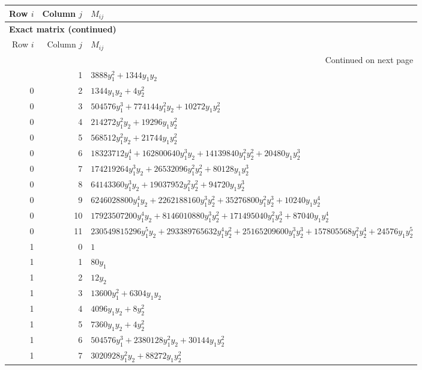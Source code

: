 \documentclass[10pt,a4paper]{article}
\begin{document}
{\small\setlength{\tabcolsep}{7pt}\begin{longtable}{rrp{125mm}}
\toprule Row $i$ & Column $j$ & $M_{ij}$\\\midrule\endfirsthead
\multicolumn{3}{l}{\textbf{Exact matrix (continued)}}\\
\toprule Row $i$ & Column $j$ & $M_{ij}$\\\midrule\endhead
\midrule\multicolumn{3}{r}{Continued on next page}\\\endfoot\bottomrule\endlastfoot
0 & 1 & $3888 y_{1}^{2} + 1344 y_{1} y_{2}$\\
0 & 2 & $1344 y_{1} y_{2} + 4 y_{2}^{2}$\\
0 & 3 & $504576 y_{1}^{3} + 774144 y_{1}^{2} y_{2} + 10272 y_{1} y_{2}^{2}$\\
0 & 4 & $214272 y_{1}^{2} y_{2} + 19296 y_{1} y_{2}^{2}$\\
0 & 5 & $568512 y_{1}^{2} y_{2} + 21744 y_{1} y_{2}^{2}$\\
0 & 6 & $18323712 y_{1}^{4} + 162800640 y_{1}^{3} y_{2} + 14139840 y_{1}^{2} y_{2}^{2} + 20480 y_{1} y_{2}^{3}$\\
0 & 7 & $174219264 y_{1}^{3} y_{2} + 26532096 y_{1}^{2} y_{2}^{2} + 80128 y_{1} y_{2}^{3}$\\
0 & 8 & $64143360 y_{1}^{3} y_{2} + 19037952 y_{1}^{2} y_{2}^{2} + 94720 y_{1} y_{2}^{3}$\\
0 & 9 & $6246028800 y_{1}^{4} y_{2} + 2262188160 y_{1}^{3} y_{2}^{2} + 35276800 y_{1}^{2} y_{2}^{3} + 10240 y_{1} y_{2}^{4}$\\
0 & 10 & $17923507200 y_{1}^{4} y_{2} + 8146010880 y_{1}^{3} y_{2}^{2} + 171495040 y_{1}^{2} y_{2}^{3} + 87040 y_{1} y_{2}^{4}$\\
0 & 11 & $230549815296 y_{1}^{5} y_{2} + 293389765632 y_{1}^{4} y_{2}^{2} + 25165209600 y_{1}^{3} y_{2}^{3} + 157805568 y_{1}^{2} y_{2}^{4} + 24576 y_{1} y_{2}^{5}$\\
1 & 0 & $1$\\
1 & 1 & $80 y_{1}$\\
1 & 2 & $12 y_{2}$\\
1 & 3 & $13600 y_{1}^{2} + 6304 y_{1} y_{2}$\\
1 & 4 & $4096 y_{1} y_{2} + 8 y_{2}^{2}$\\
1 & 5 & $7360 y_{1} y_{2} + 4 y_{2}^{2}$\\
1 & 6 & $504576 y_{1}^{3} + 2380128 y_{1}^{2} y_{2} + 30144 y_{1} y_{2}^{2}$\\
1 & 7 & $3020928 y_{1}^{2} y_{2} + 88272 y_{1} y_{2}^{2}$\\

\end{longtable}}
\end{document}
